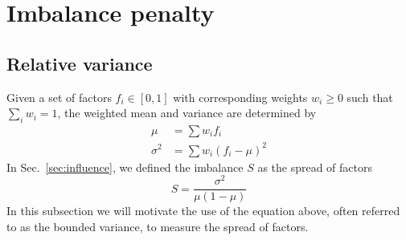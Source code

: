 \section{Imbalance penalty}


\subsection{Relative variance}
\label{app:relative-variance}

Given a set of factors $f_i\in[0,1]$ with corresponding weights $w_i \geq 0$ such that $\sum_i w_i = 1$, the weighted mean and variance are determined by
\begin{align}
    \mu &= \sum w_i f_i\\
    \sigma^2 &= \sum w_i (f_i - \mu)^2
\end{align}
In Sec.~\ref{sec:influence}, we defined the imbalance $S$ as the spread of factors 
\begin{equation}
    S = \frac{\sigma^2}{\mu(1 - \mu)}
\end{equation}
In this subsection we will motivate the use of the equation above, often referred to as the bounded variance, to measure the spread of factors.

